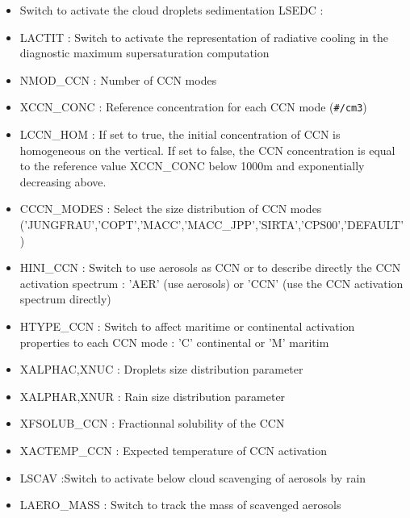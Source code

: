 \begin{itemize}
\item
{}
Switch to activate the cloud droplets sedimentation
LSEDC : 
\item
{}
LACTIT : Switch to activate the representation of radiative cooling in the diagnostic maximum supersaturation computation
\item
{}
NMOD\_CCN : Number of CCN modes
\item
{}
XCCN\_CONC : Reference concentration for each CCN mode (\verb?#/cm3?)
\item
{}
LCCN\_HOM : If set to true, the initial concentration of CCN is homogeneous on the vertical. If set to false, the CCN concentration is equal to the reference value XCCN\_CONC below 1000m and exponentially decreasing above.
\item
{}
CCCN\_MODES : Select the size distribution of CCN modes ('JUNGFRAU','COPT','MACC','MACC\_JPP','SIRTA','CPS00','DEFAULT')
\item
{}
HINI\_CCN : Switch to use aerosols as CCN or to describe directly the CCN activation spectrum : 'AER' (use aerosols) or 'CCN' (use the CCN activation spectrum directly)
\item
{}
HTYPE\_CCN : Switch to affect maritime or continental activation properties to each CCN mode : 'C' continental or 'M' maritim
\item
{}
XALPHAC,XNUC : Droplets size distribution parameter
\item
{}
XALPHAR,XNUR : Rain size distribution parameter
\item
{}
XFSOLUB\_CCN : Fractionnal solubility of the CCN
\item
{}
XACTEMP\_CCN : Expected temperature of CCN activation
\item
{}
LSCAV :Switch to activate below cloud scavenging of aerosols by rain
\item
{}
LAERO\_MASS : Switch to track the mass of scavenged aerosols
\end{itemize}

